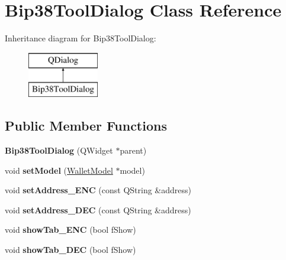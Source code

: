 \hypertarget{class_bip38_tool_dialog}{}\section{Bip38\+Tool\+Dialog Class Reference}
\label{class_bip38_tool_dialog}
Inheritance diagram for Bip38\+Tool\+Dialog\+:\begin{figure}[H]
\begin{center}
\leavevmode
\includegraphics[height=2.000000cm]{class_bip38_tool_dialog}
\end{center}
\end{figure}
\subsection*{Public Member Functions}
\begin{DoxyCompactItemize}
\item 
\mbox{\label{class_bip38_tool_dialog_ae253c496add5b5cc99bf9fec7b5dc654}} 
{\bfseries Bip38\+Tool\+Dialog} (Q\+Widget $\ast$parent)
\item 
\mbox{\label{class_bip38_tool_dialog_a2e37dfd7d0dc0dfdb57cf6b857180385}} 
void {\bfseries set\+Model} (\mbox{\hyperlink{class_wallet_model}{Wallet\+Model}} $\ast$model)
\item 
\mbox{\label{class_bip38_tool_dialog_ae361f2fb37a668ecf233f33947bacbe3}} 
void {\bfseries set\+Address\+\_\+\+E\+NC} (const Q\+String \&address)
\item 
\mbox{\label{class_bip38_tool_dialog_aff6cdfd8e8cb29bd72edd71156858049}} 
void {\bfseries set\+Address\+\_\+\+D\+EC} (const Q\+String \&address)
\item 
\mbox{\label{class_bip38_tool_dialog_afe430b8f9699b090e67d53a1ebf16471}} 
void {\bfseries show\+Tab\+\_\+\+E\+NC} (bool f\+Show)
\item 
\mbox{\label{class_bip38_tool_dialog_ab29765672d5abc354f355e77a82e7db3}} 
void {\bfseries show\+Tab\+\_\+\+D\+EC} (bool f\+Show)
\end{DoxyCompactItemize}

